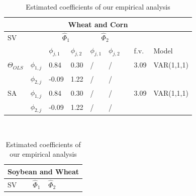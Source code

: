\documentclass[<1p>]{elsarticle} %
\begin{document}
\begin{table}[H]
\center
\caption{Estimated coefficients of our empirical analysis}
\begin{tabular}{lllllllll}
\hline
\multicolumn{9}{c}{Wheat and Corn}                                                                                                                                             \\ \hline
SV                                       &                & \multicolumn{2}{c}{$\hat\Phi_{1}$} & \multicolumn{2}{c}{$\hat\Phi_{2}$} &                  &  & \\ \hline

                                     &                & $\phi_{j,1}$    & $\phi_{j,2}$   & $\phi_{j,1}$                       & $\phi_{j,2}$ &&  f.v.& Model       \\ \hline
$\Theta_{OLS}$                     & $\phi_{1,j}$ & 0.84                & 0.30               & /                                   & /            &  & 3.09 & VAR(1,1,1)    \\
                                         & $\phi_{2,j}$ & -0.09                & 1.22               & /                                   & /             &  &    &       \\ \hline
SA                    & $\phi_{1,j}$ & 0.84                & 0.30              & /                                   & /            &     &3.09 &     VAR(1,1,1)  \\
                                         & $\phi_{2,j}$ & -0.09               & 1.22              & /                                  & /            &  &    &       \\ 
\end{tabular}

\

\begin{tabular}{lllllllll}
\hline
\multicolumn{9}{c}{Soybean and Wheat}     
\\ \hline
SV                                       &                & \multicolumn{2}{c}{$\hat\Phi_{1}$} & \multicolumn{2}{c}{$\hat\Phi_{2}$} &                  &  & \\ \hline


\end{tabular}
\end{table}
\end{document}
